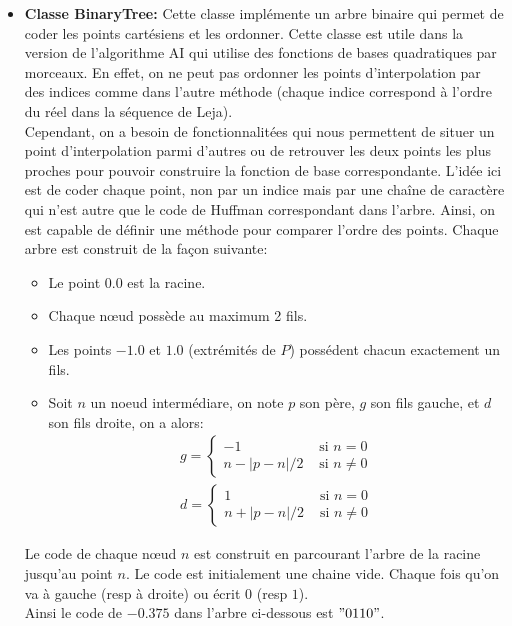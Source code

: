\begin{itemize}
\item \textbf{Classe BinaryTree:} Cette classe implémente un arbre binaire qui permet de coder les points cartésiens et les ordonner.
Cette classe est utile dans la version de l'algorithme AI qui utilise des fonctions de bases quadratiques par morceaux.
En effet, on ne peut pas ordonner les points d'interpolation par des indices comme dans l'autre méthode (chaque indice correspond à l'ordre du réel dans la séquence de Leja).\\
Cependant, on a besoin de fonctionnalitées qui nous permettent de situer un point d'interpolation parmi d'autres ou de retrouver les deux points les plus proches pour pouvoir construire la fonction
de base correspondante. L'idée ici est de coder chaque point, non par un indice mais par une chaîne de caractère qui n'est autre que le code de Huffman correspondant dans l'arbre.
Ainsi, on est capable de définir une méthode pour comparer l'ordre des points. Chaque arbre est construit de la façon suivante:
\begin{itemize}
\item Le point $0.0$ est la racine.
\item Chaque nœud possède au maximum 2 fils.
\item Les points $-1.0$ et $1.0$ (extrémités de $P$) possédent chacun exactement un fils.
\item Soit $n$ un noeud intermédiare, on note $p$ son père, $g$ son fils gauche, et $d$ son fils droite, on a alors:
\begin{align}
g =
\begin{cases}
 -1 & \text{ si } n=0 \\
 n-\left | p-n \right |/2 & \text{ si } n\neq0
\end{cases}
\\
d =
\begin{cases}
 1 & \text{ si } n=0 \\
 n+\left | p-n \right |/2 & \text{ si } n\neq0
\end{cases}
\end{align}
\end{itemize}
Le code de chaque nœud $n$ est construit en parcourant l'arbre de la racine jusqu'au point $n$.
Le code est initialement une chaine vide. Chaque fois qu'on va à gauche (resp à droite) ou écrit $0$ (resp $1$).\\
Ainsi le code de $-0.375$ dans l'arbre ci-dessous est $"0110"$.\\
\begin{center}

\end{center}
\end{itemize}
